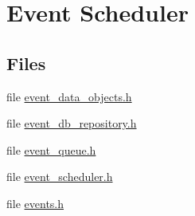 \hypertarget{group__Event__Scheduler}{}\section{Event Scheduler}
\label{group__Event__Scheduler}
\subsection*{Files}
\begin{DoxyCompactItemize}
\item 
file \mbox{\hyperlink{event__data__objects_8h}{event\+\_\+data\+\_\+objects.\+h}}
\item 
file \mbox{\hyperlink{event__db__repository_8h}{event\+\_\+db\+\_\+repository.\+h}}
\item 
file \mbox{\hyperlink{event__queue_8h}{event\+\_\+queue.\+h}}
\item 
file \mbox{\hyperlink{event__scheduler_8h}{event\+\_\+scheduler.\+h}}
\item 
file \mbox{\hyperlink{events_8h}{events.\+h}}
\end{DoxyCompactItemize}
